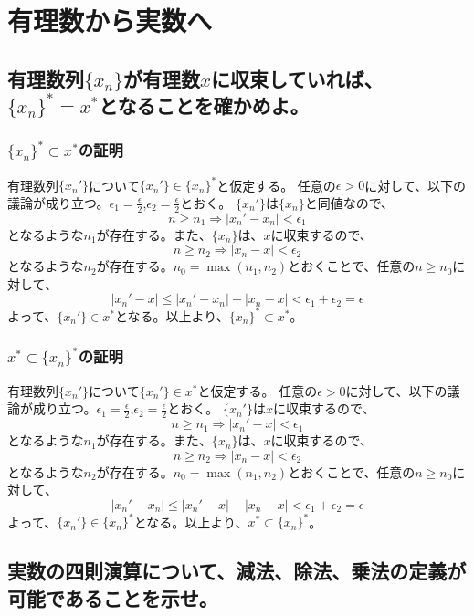 \documentclass{jsarticle}
\begin{document}
\newpage
\appendix
\section{有理数から実数へ}
\subsection{有理数列$\{x_n\}$が有理数$x$に収束していれば、$\{x_n\}^*=x^*$となることを確かめよ。}
\subsubsection{$\{x_n\}^*\subset x^*$の証明}
有理数列$\{x_n'\}$について$\{x_n'\}\in\{x_n\}^*$と仮定する。
任意の$\epsilon>0$に対して、以下の議論が成り立つ。$\epsilon_1=\frac{\epsilon}{2}$,$\epsilon_2=\frac{\epsilon}{2}$とおく。
$\{x_n'\}$は$\{x_n\}$と同値なので、
\[n\geq n_1 \Longrightarrow|x_n'-x_n|<\epsilon_1\]
となるような$n_1$が存在する。また、$\{x_n\}$は、$x$に収束するので、
\[n\geq n_2 \Longrightarrow|x_n-x|<\epsilon_2\]
となるような$n_2$が存在する。$n_0=\max(n_1,n_2)$とおくことで、任意の$n\geq n_0$に対して、
\[|x_n'-x|\leq |x_n'-x_n|+|x_n-x| < \epsilon_1+\epsilon_2 =\epsilon\]
よって、$\{x_n'\}\in x^*$となる。以上より、$\{x_n\}^*\subset x^*$。

\subsubsection{$x^*\subset \{x_n\}^*$の証明}

有理数列$\{x_n'\}$について$\{x_n'\}\in x^*$と仮定する。
任意の$\epsilon>0$に対して、以下の議論が成り立つ。$\epsilon_1=\frac{\epsilon}{2}$,$\epsilon_2=\frac{\epsilon}{2}$とおく。
$\{x_n'\}$は$x$に収束するので、
\[n\geq n_1 \Longrightarrow|x_n'-x|<\epsilon_1\]
となるような$n_1$が存在する。また、$\{x_n\}$は、$x$に収束するので、
\[n\geq n_2 \Longrightarrow|x_n-x|<\epsilon_2\]
となるような$n_2$が存在する。$n_0=\max(n_1,n_2)$とおくことで、任意の$n\geq n_0$に対して、
\[|x_n'-x_n|\leq |x_n'-x|+|x_n-x| < \epsilon_1+\epsilon_2 =\epsilon\]
よって、$\{x_n'\}\in \{x_n\}^*$となる。以上より、$x^*\subset \{x_n\}^*$。



\subsection{実数の四則演算について、減法、除法、乗法の定義が可能であることを示せ。}
\end{document}
